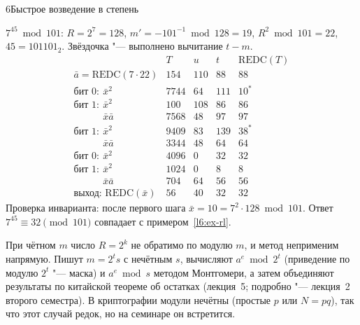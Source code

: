 \begin{lecture}{6}{Быстрое возведение в степень}
\begin{example}\label{l6:ex-mont}
$7^{45} \bmod 101$: $R = 2^7 = 128$, $m' = -101^{-1} \bmod 128 = 19$, $R^2 \bmod 101 = 22$,
$45 = 101101_2$. Звёздочка "--- выполнено вычитание $t - m$.
\[
\begin{array}{l|r|r|r|r}
  & T & u & t & \mathrm{REDC}(T) \\ \hline
  \bar a = \mathrm{REDC}(7 \cdot 22) & 154 & 110 & 88 & 88 \\
  \text{бит } 0:\ \bar x^2 & 7744 & 64 & 111 & 10^{*} \\
  \text{бит } 1:\ \bar x^2 & 100 & 108 & 86 & 86 \\
  \phantom{\text{бит } 1:\ }\bar x \bar a & 7568 & 48 & 97 & 97 \\
  \text{бит } 1:\ \bar x^2 & 9409 & 83 & 139 & 38^{*} \\
  \phantom{\text{бит } 1:\ }\bar x \bar a & 3344 & 48 & 64 & 64 \\
  \text{бит } 0:\ \bar x^2 & 4096 & 0 & 32 & 32 \\
  \text{бит } 1:\ \bar x^2 & 1024 & 0 & 8 & 8 \\
  \phantom{\text{бит } 1:\ }\bar x \bar a & 704 & 64 & 56 & 56 \\
  \text{выход: } \mathrm{REDC}(\bar x) & 56 & 40 & 32 & 32
\end{array}
\]
Проверка инварианта: после первого шага $\bar x = 10 = 7^2 \cdot 128 \bmod 101$. Ответ
$7^{45} \equiv 32 \pmod{101}$ совпадает с примером~\ref{l6:ex-rl}.
\end{example}


\begin{remark}
При чётном $m$ число $R = 2^k$ не обратимо по модулю $m$, и метод неприменим напрямую. Пишут
$m = 2^t s$ с нечётным $s$, вычисляют $a^e \bmod 2^t$ (приведение по модулю $2^t$ "--- маска)
и $a^e \bmod s$ методом Монтгомери, а затем объединяют результаты по китайской теореме об остатках
(лекция~5; подробно "--- лекция~2 второго семестра). В криптографии
модули нечётны (простые $p$ или $N = pq$), так что этот случай редок, но на семинаре он встретится.
\end{remark}




\end{lecture}
